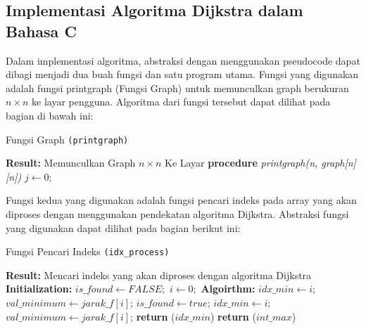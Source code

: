\documentclass[conference]{IEEEtran}
\begin{document}
\subsection{Implementasi Algoritma Dijkstra dalam Bahasa C}
Dalam implementasi algoritma, abstraksi dengan menggunakan pseudocode dapat dibagi menjadi dua buah fungsi
dan satu program utama. Fungsi yang digunakan adalah fungsi printgraph (Fungsi Graph) untuk memunculkan graph
berukuran $n \times n$ ke layar pengguna. Algoritma dari fungsi tersebut dapat dilihat pada bagian di bawah ini:

\begin{algorithm}
\caption{Fungsi Graph \texttt{(printgraph)}}
\begin{algorithmic}
\State \textbf{Result:} Memunculkan Graph $n \times n$ Ke Layar
\State \textbf{procedure} \textit{printgraph(n, graph[n][n])}
\State $j \leftarrow 0;$
\Else
{}
\EndIf
{}
\EndWhile
{}
\EndWhile
\end{algorithmic}
\end{algorithm}

Fungsi kedua yang digunakan adalah fungsi pencari indeks pada array yang akan diproses
dengan menggunakan pendekatan algoritma Dijkstra. Abstraksi fungsi yang digunakan dapat dilihat
pada bagian berikut ini:

\begin{algorithm}
\caption{Fungsi Pencari Indeks \texttt{(idx\_process)}}
\begin{algorithmic}
\State \textbf{Result:} Mencari indeks yang akan diproses dengan algoritma Dijkstra
\State \textbf{Initialization:}
\State \textit{$is\_found \leftarrow FALSE;$}
\State \textit{$i \leftarrow 0;$}
\State \textbf{Algoirthm:}
\State $idx\_min \leftarrow i$;
\State $val\_minimum \leftarrow jarak\_f[i]$;
\State $is\_found \leftarrow true$;
\EndIf
{}
\State $idx\_min \leftarrow i$;
\State $val\_minimum \leftarrow jarak\_f[i]$;
\EndIf
\EndWhile
{}
\State \textbf{return} ($idx\_min$)
\Else
\State \textbf{return} ($int\_max$)
\EndIf
\end{algorithmic}
\end{algorithm}
\end{document}
